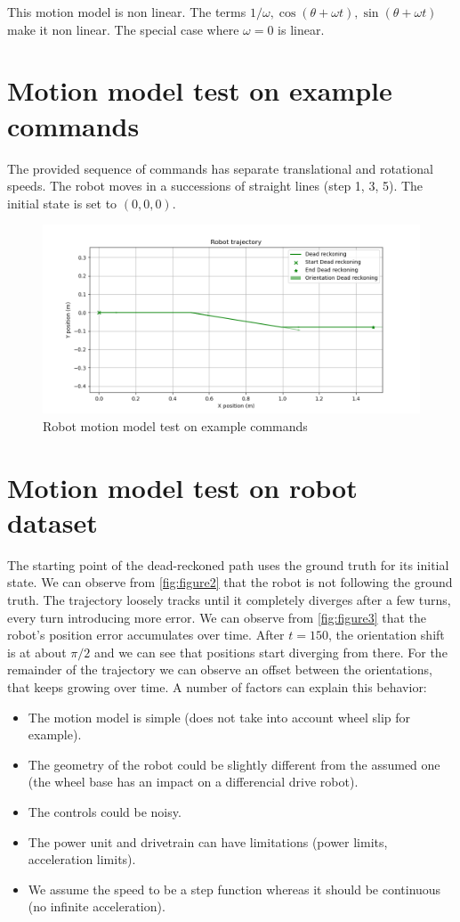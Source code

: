 \documentclass{article}
\begin{document}
This motion model is non linear. The terms $1/\omega, \cos(\theta+\omega t), \sin(\theta+\omega t)$ make it non linear. The  special case where $\omega=0$ is linear.

\section{Motion model test on example commands}
The provided sequence of commands has separate translational and rotational speeds. The robot moves in a successions of straight lines (step 1, 3, 5). The initial state is set to $(0,0,0)$.

\begin{figure}
\centering
\includegraphics[scale=0.3]{Figure_1.png}
\caption{Robot motion model test on example commands}
\label{fig:figure1}
\end{figure}

\section{Motion model test on robot dataset}
The starting point of the dead-reckoned path uses the ground truth for its initial state. We can observe from \autoref{fig:figure2} that the robot is not following the ground truth. The trajectory loosely tracks until it completely diverges after a few turns, every turn introducing more error. We can observe from \autoref{fig:figure3} that the robot's position error accumulates over time. After $t=150$, the orientation shift is at about $\pi/2$ and we can see that positions start diverging from there. For the remainder of the trajectory we can observe an offset between the orientations, that keeps growing over time.
A number of factors can explain this behavior:
\begin{itemize}
      \item The motion model is simple (does not take into account wheel slip for example).
      \item The geometry of the robot could be slightly different from the assumed one (the wheel base has an impact on a differencial drive robot).
      \item The controls could be noisy.
      \item The power unit and drivetrain can have limitations (power limits, acceleration limits).
      \item We assume the speed to be a step function whereas it should be continuous (no infinite acceleration).

\end{itemize}
\end{document}
